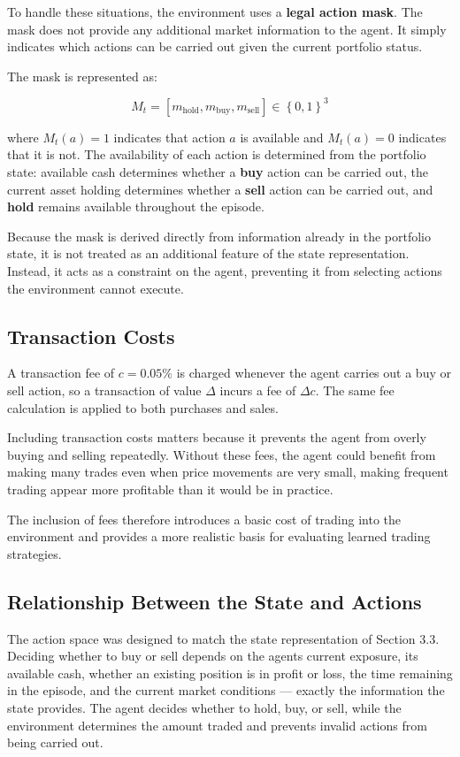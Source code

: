 To handle these situations, the environment uses a \textbf{legal action
mask}. The mask does not provide any additional market information to
the agent. It simply indicates which actions can be carried out given
the current portfolio status.

The mask is represented as:

\[M_{t} = \left\lbrack m_{\text{hold}},m_{\text{buy}},m_{\text{sell}} \right\rbrack \in \left\{ 0,1 \right\}^{3}\]

where \(M_{t}(a) = 1\) indicates that action \(a\) is available and
\(M_{t}(a) = 0\) indicates that it is not. The availability of each
action is determined from the portfolio state: available cash determines
whether a \textbf{buy} action can be carried out, the current asset
holding determines whether a \textbf{sell} action can be carried out,
and \textbf{hold} remains available throughout the episode.

Because the mask is derived directly from information already in the
portfolio state, it is not treated as an additional feature of the state
representation. Instead, it acts as a constraint on the agent,
preventing it from selecting actions the environment cannot execute.

\subsection{Transaction Costs}

A transaction fee of \(c = 0.05\%\) is charged whenever the agent
carries out a buy or sell action, so a transaction of value \(\Delta\)
incurs a fee of \(\Delta c\). The same fee calculation is applied to
both purchases and sales.

Including transaction costs matters because it prevents the agent from
overly buying and selling repeatedly. Without these fees, the agent
could benefit from making many trades even when price movements are very
small, making frequent trading appear more profitable than it would be
in practice.

The inclusion of fees therefore introduces a basic cost of trading into
the environment and provides a more realistic basis for evaluating
learned trading strategies.

\subsection{Relationship Between the State and Actions}

The action space was designed to match the state representation of
Section 3.3. Deciding whether to buy or sell depends on the
agent\textquotesingle s current exposure, its available cash, whether an
existing position is in profit or loss, the time remaining in the
episode, and the current market conditions --- exactly the information
the state provides. The agent decides whether to hold, buy, or sell,
while the environment determines the amount traded and prevents invalid
actions from being carried out.

